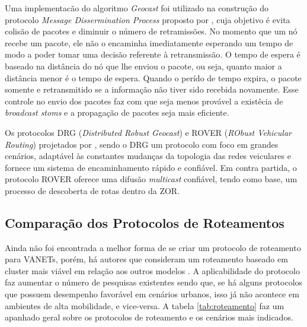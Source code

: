 \documentclass[
	12pt,				%
	oneside,			%
	a4paper,			%
	english,			%
	brazil				%
	]{abntex2ppgsi}
\begin{document}
Uma implementacão do algoritmo \textit{Geocast} foi utilizado na construção do protocolo \textit{Message Dissermination Process} proposto por  , cuja objetivo é evita colisão de pacotes e diminuir o número de retramissões. No momento que um nó recebe um pacote, ele não o encaminha imediatamente esperando um tempo de  modo a poder tomar uma decisão referente à retransmissão. O tempo de espera é baseado na distância do nó que lhe enviou o pacote, ou seja, quanto maior a distância menor é o tempo de espera. Quando o perído de tempo expira, o pacote somente e retransmitido se a informação não tiver sido recebida novamente. Esse controle no envio dos pacotes  faz com que seja menos provável a existêcia de \textit{broadcast stoms} e a propagação de pacotes seja mais eficiente.

Os protocolos DRG (\textit{Distributed Robust Geocast}) e ROVER (\textit{RObust Vehicular Routing}) projetados por , sendo o DRG um protocolo com foco em grandes cenários, adaptável às constantes mudanças da topologia das redes veiculares e fornece um sistema de encaminhamento rápido e confiável. Em contra partida, o protocolo ROVER oferece uma difusão \textit{multicast} confiável, tendo como base, um processo de descoberta de rotas dentro da ZOR.

\subsection{Comparação dos Protocolos de Roteamentos}

Ainda não foi encontrada a melhor forma de se criar um protocolo de roteamento para VANETs, porém, há autores que consideram um roteamento baseado em cluster mais viável em relação aos outros modelos \cite{luis2009melhoria}. A aplicabilidade do protocolo faz aumentar o número de pesquisas existentes sendo que, se há alguns protocolos que possuem desempenho favorável em cenários urbanos, isso já não acontece em ambientes de alta mobilidade, e vice-versa. A tabela \ref{tab:roteamento} faz um apanhado geral sobre os protocolos de roteamento e os cenários mais indicados.
\end{document}
